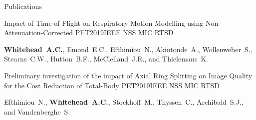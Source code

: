 \documentclass{cv}
\begin{document}
\begin{rSection}{Publications}
        \item \begin{rSubsection}{Impact of Time-of-Flight on Respiratory Motion Modelling using Non-Attenuation-Corrected \newline PET}{2019}{IEEE NSS MIC RTSD}{}
            \item \textbf{Whitehead~A.C.}, Emond~E.C., Efthimiou~N., Akintonde~A., Wollenweber~S., Stearns~C.W., Hutton~B.F., McClelland~J.R., and Thielemans~K.
        \end{rSubsection}
        
        \item \begin{rSubsection}{Preliminary investigation of the impact of Axial Ring Splitting on Image Quality for the Cost Reduction of Total-Body PET}{2019}{IEEE NSS MIC RTSD}{}
            \item Efthimiou~N., \textbf{Whitehead~A.C.}, Stockhoff~M., Thyssen~C., Archibald~S.J., and Vandenberghe~S.
        \end{rSubsection}
    \end{rSection}
    
\end{document}
